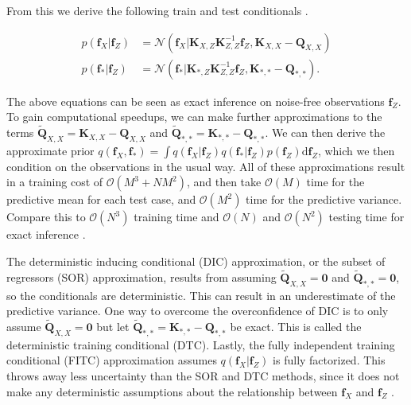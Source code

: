 \documentclass[../../../main.tex]{subfiles}
\begin{document}
From this we derive the following train and test conditionals \autocite{Murphy2023}.

\begin{align}
p(\bm{f}_X|\bm{f}_Z) &= \mathcal{N}(\bm{f}_X|\bm{K}_{X,Z}\bm{K}_{Z,Z}^{-1}\bm{f}_Z,\bm{K}_{X,X}-\bm{Q}_{X,X}) \\
p(\bm{f}_\ast|\bm{f}_Z) &= \mathcal{N}(\bm{f}_\ast|\bm{K}_{\ast,Z}\bm{K}_{Z,Z}^{-1}\bm{f}_Z,\bm{K}_{\ast,\ast}-\bm{Q}_{\ast,\ast}).
\end{align}

The above equations can be seen as exact inference on noise-free observations $\bm{f}_Z$. To gain computational speedups, we can make further approximations to the terms $\tilde{\bm{Q}}_{X,X}=\bm{K}_{X,X}-\bm{Q}_{X,X}$ and $\tilde{\bm{Q}}_{\ast,\ast}=\bm{K}_{\ast,\ast}-\bm{Q}_{\ast,\ast}$. We can then derive the approximate prior $q(\bm{f}_X,\bm{f}_\ast)=\int q(\bm{f}_X|\bm{f}_Z)q(\bm{f}_\ast|\bm{f}_Z)p(\bm{f}_Z)\mathrm{d}\bm{f}_Z$, which we then condition on the observations in the usual way. All of these approximations result in a training cost of $\mathcal{O}(M^3+NM^2)$, and then take $\mathcal{O}(M)$ time for the predictive mean for each test case, and $\mathcal{O}(M^2)$ time for the predictive variance. Compare this to $\mathcal{O}(N^3)$ training time and $\mathcal{O}(N)$ and $\mathcal{O}(N^2)$ testing time for exact inference \autocite{Murphy2023}.

The deterministic inducing conditional (DIC) approximation, or the subset of regressors (SOR) approximation, results from assuming $\tilde{\bm{Q}}_{X,X}=\bm{0}$ and $\tilde{\bm{Q}}_{\ast,\ast}=\bm{0}$, so the conditionals are deterministic. This can result in an underestimate of the predictive variance. One way to overcome the overconfidence of DIC is to only assume $\tilde{\bm{Q}}_{X,X}=\bm{0}$ but let $\tilde{\bm{Q}}_{\ast,\ast}=\bm{K}_{\ast,\ast}-\bm{Q}_{\ast,\ast}$ be exact. This is called the deterministic training conditional (DTC). Lastly, the fully independent training conditional (FITC) approximation assumes $q(\bm{f}_X|\bm{f}_Z)$ is fully factorized. This throws away less uncertainty than the SOR and DTC methods, since it does not make any deterministic assumptions about the relationship between $\bm{f}_X$ and $\bm{f}_Z$ \autocite{Murphy2023}.
\end{document}
